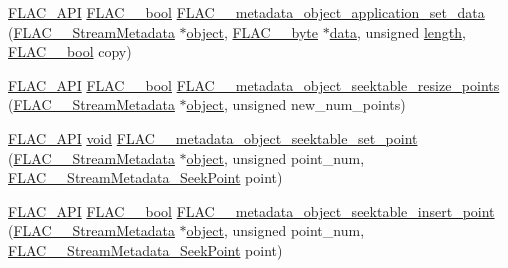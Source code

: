 \begin{DoxyCompactItemize}
\item 
\mbox{\hyperlink{group__flac__export_ga56ca07df8a23310707732b1c0007d6f5}{F\+L\+A\+C\+\_\+\+A\+PI}} \mbox{\hyperlink{ordinals_8h_a95103469f1cbd78b8cf250194985b34e}{F\+L\+A\+C\+\_\+\+\_\+bool}} \mbox{\hyperlink{group__flac__metadata__object_ga8f7fbaa68d5637e2409a053ec2ff744d}{F\+L\+A\+C\+\_\+\+\_\+metadata\+\_\+object\+\_\+application\+\_\+set\+\_\+data}} (\mbox{\hyperlink{struct_f_l_a_c_____stream_metadata}{F\+L\+A\+C\+\_\+\+\_\+\+Stream\+Metadata}} $\ast$\mbox{\hyperlink{_s_d_l__opengl__glext_8h_ab49790263c78300fbf05719e38246198}{object}}, \mbox{\hyperlink{ordinals_8h_a5eb569b12d5b047cdacada4d57924ee3}{F\+L\+A\+C\+\_\+\+\_\+byte}} $\ast$\mbox{\hyperlink{_s_d_l__opengl_8h_a2e335d56e2846b0fea47eed068b2d34a}{data}}, unsigned \mbox{\hyperlink{_s_d_l__opengl__glext_8h_ab9c919755bde3b34349e23a32b4e0fa7}{length}}, \mbox{\hyperlink{ordinals_8h_a95103469f1cbd78b8cf250194985b34e}{F\+L\+A\+C\+\_\+\+\_\+bool}} copy)
\item 
\mbox{\hyperlink{group__flac__export_ga56ca07df8a23310707732b1c0007d6f5}{F\+L\+A\+C\+\_\+\+A\+PI}} \mbox{\hyperlink{ordinals_8h_a95103469f1cbd78b8cf250194985b34e}{F\+L\+A\+C\+\_\+\+\_\+bool}} \mbox{\hyperlink{group__flac__metadata__object_ga836f94fa622ece4f50dadf27c7ec107a}{F\+L\+A\+C\+\_\+\+\_\+metadata\+\_\+object\+\_\+seektable\+\_\+resize\+\_\+points}} (\mbox{\hyperlink{struct_f_l_a_c_____stream_metadata}{F\+L\+A\+C\+\_\+\+\_\+\+Stream\+Metadata}} $\ast$\mbox{\hyperlink{_s_d_l__opengl__glext_8h_ab49790263c78300fbf05719e38246198}{object}}, unsigned new\+\_\+num\+\_\+points)
\item 
\mbox{\hyperlink{group__flac__export_ga56ca07df8a23310707732b1c0007d6f5}{F\+L\+A\+C\+\_\+\+A\+PI}} \mbox{\hyperlink{_s_d_l__opengles2__gl2ext_8h_ae5d8fa23ad07c48bb609509eae494c95}{void}} \mbox{\hyperlink{group__flac__metadata__object_gae2c58ebdfb9f2b238d45971b14600944}{F\+L\+A\+C\+\_\+\+\_\+metadata\+\_\+object\+\_\+seektable\+\_\+set\+\_\+point}} (\mbox{\hyperlink{struct_f_l_a_c_____stream_metadata}{F\+L\+A\+C\+\_\+\+\_\+\+Stream\+Metadata}} $\ast$\mbox{\hyperlink{_s_d_l__opengl__glext_8h_ab49790263c78300fbf05719e38246198}{object}}, unsigned point\+\_\+num, \mbox{\hyperlink{struct_f_l_a_c_____stream_metadata___seek_point}{F\+L\+A\+C\+\_\+\+\_\+\+Stream\+Metadata\+\_\+\+Seek\+Point}} point)
\item 
\mbox{\hyperlink{group__flac__export_ga56ca07df8a23310707732b1c0007d6f5}{F\+L\+A\+C\+\_\+\+A\+PI}} \mbox{\hyperlink{ordinals_8h_a95103469f1cbd78b8cf250194985b34e}{F\+L\+A\+C\+\_\+\+\_\+bool}} \mbox{\hyperlink{group__flac__metadata__object_ga0c658260aaffb126486f5d1e211b53e5}{F\+L\+A\+C\+\_\+\+\_\+metadata\+\_\+object\+\_\+seektable\+\_\+insert\+\_\+point}} (\mbox{\hyperlink{struct_f_l_a_c_____stream_metadata}{F\+L\+A\+C\+\_\+\+\_\+\+Stream\+Metadata}} $\ast$\mbox{\hyperlink{_s_d_l__opengl__glext_8h_ab49790263c78300fbf05719e38246198}{object}}, unsigned point\+\_\+num, \mbox{\hyperlink{struct_f_l_a_c_____stream_metadata___seek_point}{F\+L\+A\+C\+\_\+\+\_\+\+Stream\+Metadata\+\_\+\+Seek\+Point}} point)

\end{DoxyCompactItemize}

